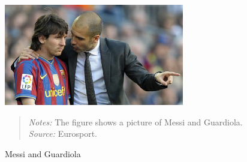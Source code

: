 \begin{figure}[h!]
    \centering
    \includegraphics[width=0.7\textwidth]{graphics/messi_pep.jpg}
    \caption{Messi and Guardiola}
    \label{fig:messi_pep}
    \begin{quote}
        \textit{Notes:} 
        The figure shows a picture of Messi and Guardiola.
        \textit{Source:} Eurosport.
    \end{quote} 
\end{figure}
